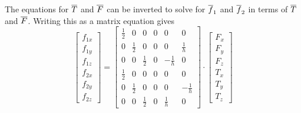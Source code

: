 \documentclass[12pt]{article}
\begin{document}
The equations for $\overline{T}$ and $\overline{F}$ can be inverted to solve for $\overline{f}_1$ and
$\overline{f}_2$ in terms of $\overline{T}$ and $\overline{F}$. Writing this as a matrix equation gives
\[
\left[\begin{array}{c}f_{1x} \\ f_{1y} \\ f_{1z} \\ f_{2x} \\ f_{2y} \\ f_{2z}
 \end{array}\right] =
\left[\begin{array}{cccccc}
\frac{1}{2} & 0 & 0 & 0 & 0 & 0 \\
0 & \frac{1}{2} & 0 & 0 & 0 & \frac{1}{h} \\
0 & 0 & \frac{1}{2} & 0 & -\frac{1}{h} & 0 \\
\frac{1}{2} & 0 & 0 & 0 & 0 & 0 \\
0 & \frac{1}{2} & 0 & 0 & 0 & -\frac{1}{h} \\
0 & 0 & \frac{1}{2} & 0  &\frac{1}{h} & 0
\end{array}\right]\cdot
\left[\begin{array}{c} F_x \\ F_y \\ F_z \\ T_x \\ T_y \\ T_z
\end{array}\right]
\]


\end{document}
